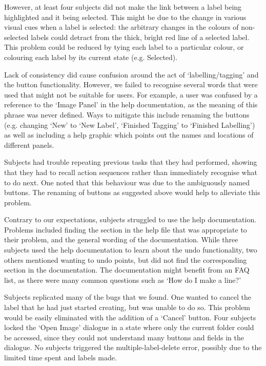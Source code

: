 \documentclass[11pt,twocolumn]{article}
\begin{document}
However, at least four subjects did not make the link between a label being
highlighted and it being selected. This might be due to the change in various
visual cues when a label is selected: the arbitrary changes in the colours of
non-selected labels could detract from the thick, bright red line of a selected
label. This problem could be reduced by tying each label to a particular
colour, or colouring each label by its current state (e.g. Selected).

Lack of consistency did cause confusion around the act of `labelling/tagging'
and the button functionality. However, we failed to recognise several words
that were used that might not be suitable for users. For example, a user was
confused by a reference to the `Image Panel' in the help documentation, as the
meaning of this phrase was never defined. Ways to mitigate this include
renaming the buttons (e.g. changing `New' to `New Label', `Finished Tagging' to
`Finished Labelling') as well as including a help graphic which points out the
names and locations of different panels.

Subjects had trouble repeating previous tasks that they had performed, showing
that they had to recall action sequences rather than immediately recognise
what to do next. One noted that this behaviour was due to the ambiguously named
buttons. The renaming of buttons as suggested above would help to alleviate
this problem. 
 
Contrary to our expectations, subjects struggled to use the help documentation.
Problems included finding the section in the help file that was appropriate to
their problem, and the general wording of the documentation. While three
subjects used the help documentation to learn about the undo functionality, two
others mentioned wanting to undo points, but did not find the corresponding
section in the documentation. The documentation might benefit from an FAQ list,
as there were many common questions such as `How do I make a line?'

Subjects replicated many of the bugs that we found. One wanted to cancel the
label that he had just started creating, but was unable to do so. This problem
would be easily eliminated with the addition of a `Cancel' button. Four
subjects locked the `Open Image' dialogue in a state where only the current
folder could be accessed, since they could not understand many buttons and
fields in the dialogue. No subjects triggered the multiple-label-delete
error, possibly due to the limited time spent and labels made.
\end{document}
